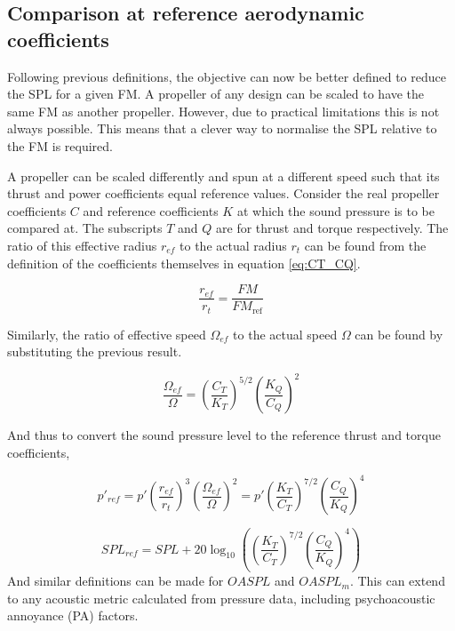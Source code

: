 \documentclass[12pt,a4paper]{article}
\begin{document}
\subsection{Comparison at reference aerodynamic coefficients}
Following previous definitions, the objective can now be better defined to reduce the SPL for a given FM.
A propeller of any design can be scaled to have the same FM as another propeller.
However, due to practical limitations this is not always possible. 
This means that a clever way to normalise the SPL relative to the FM is required.

A propeller can be scaled differently and spun at a different speed such that its thrust and power coefficients equal reference values.
Consider the real propeller coefficients $C$ and reference coefficients $K$ at which the sound pressure is to be compared at.
The subscripts $T$ and $Q$ are for thrust and torque respectively.
The ratio of this effective radius $r_{ef}$ to the actual radius $r_t$ can be found from the definition of the coefficients themselves in equation \ref{eq:CT_CQ}.

\begin{equation}
    \frac{r_{ef}}{r_t} = \frac{FM}{FM_\text{ref}}
\end{equation}

Similarly, the ratio of effective speed $\Omega_{ef}$ to the actual speed $\Omega$ can be found by substituting the previous result.

\begin{equation}
    \frac{\Omega_{ef}}{\Omega} = \left(\frac{C_T}{K_T}\right)^{5/2} \left( \frac{K_Q}{C_Q} \right)^2
\end{equation}

And thus to convert the sound pressure level to the reference thrust and torque coefficients,

\begin{equation}
    p'_{ref} = p' \left(\frac{r_{ef}}{r_t}\right)^3 \left( \frac{\Omega_{ef}}{\Omega}\right)^2 = p' \left(\frac{K_T}{C_T}\right)^{7/2} \left(\frac{C_Q}{K_Q} \right)^4
\end{equation}

\begin{equation}
    SPL_{ref} = SPL + 20 \log_{10} \left( \left(\frac{K_T}{C_T}\right)^{7/2} \left(\frac{C_Q}{K_Q} \right)^4  \right)
\end{equation}
And similar definitions can be made for $OASPL$ and $OASPL_m$.
This can extend to any acoustic metric calculated from pressure data, including psychoacoustic annoyance (PA) factors.
\end{document}

